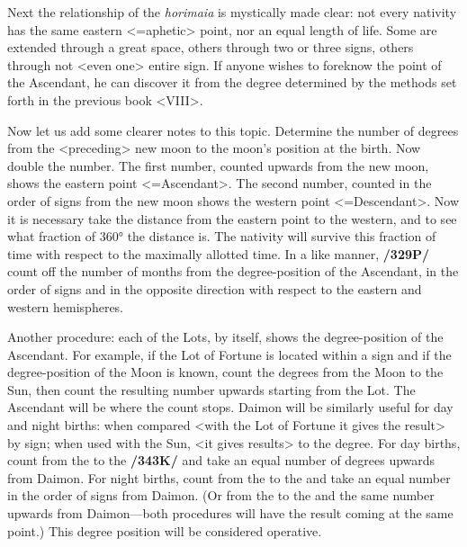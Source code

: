 Next the relationship of the \textit{horimaia} is mystically made clear: not every nativity has the same eastern <=aphetic> point, nor an equal length of life. Some are extended through a great space, others through two or three signs, others through not <even one> entire sign. If anyone wishes to foreknow the point of the Ascendant, he can discover it from the degree determined by the methods set forth in the previous book <VIII>. 

Now let us add some clearer notes to this topic. Determine the number of degrees from the <preceding> new moon to the moon’s position at the birth. Now double the number. The first number, counted upwards from the new moon, shows the eastern point
<=Ascendant>. The second number, counted in the order of signs from the new moon shows the western point <=Descendant>. Now it is necessary take the distance from the eastern point to the western, and to see what fraction of 360° the distance is. The nativity will survive this fraction of time with respect to the maximally allotted time. In a like manner, \textbf{/329P/} count off the number of months from the degree-position of the Ascendant, in the order of signs and in the opposite direction with respect to the eastern and western hemispheres. 

Another procedure: each of the Lots, by itself, shows the degree-position of the Ascendant. For example, if the Lot of Fortune is located within a sign and if the degree-position of the Moon is known,
count the degrees from the Moon to the Sun, then count the resulting number upwards starting from the Lot. The Ascendant will be where the count stops. Daimon will be similarly useful for day and night
births: when compared <with the Lot of Fortune it gives the result> by sign; when used with the Sun, <it gives results> to the degree. For day births, count from the \Sun\xspace to the \Moon\xspace \textbf{/343K/} and take an equal number of degrees upwards from Daimon. For night births, count from the \Moon\xspace to the \Sun\xspace and take an equal number in the order of signs from Daimon. (Or from the \Sun\xspace to the \Moon\xspace and the same number upwards from Daimon—both procedures will have the result coming at the same point.) This degree position will be considered operative.


